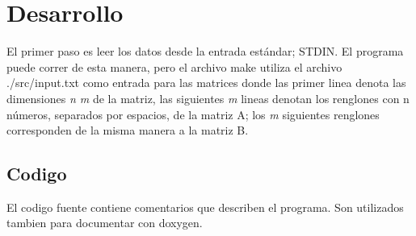 \documentclass[12pt]{article}
\begin{document}
\section{Desarrollo}
El primer paso es leer los datos desde la entrada estándar; STDIN. El programa puede correr de esta manera, pero el archivo make utiliza el archivo ./src/input.txt como entrada para las matrices donde las primer linea denota las dimensiones \emph{n m} de la matriz, las siguientes \emph{m} lineas denotan los renglones con n números, separados por espacios, de la matriz A; los \emph{m} siguientes renglones corresponden de la misma manera a la matriz B. 
\subsection{Codigo}
El codigo fuente contiene comentarios que describen el programa. Son utilizados tambien para documentar con doxygen.
\end{document}
